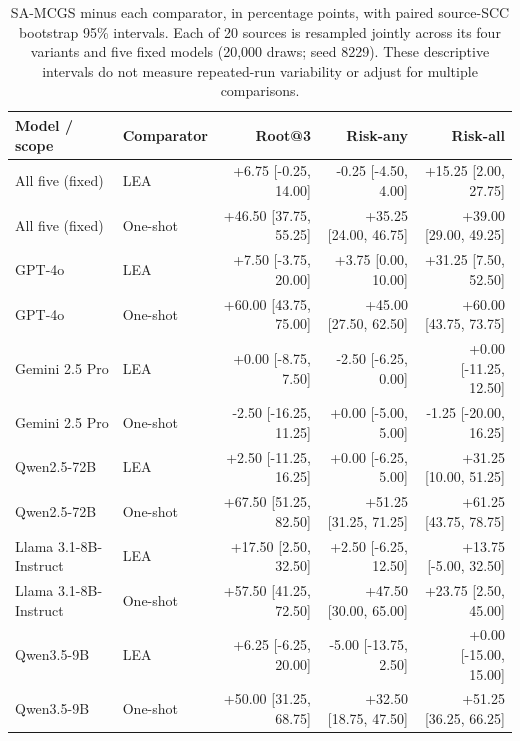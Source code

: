 \begin{revadded}
\begin{table}[t]
\centering\small
\begin{tabular}{llrrr}
\toprule
Model / scope & Comparator & Root@3 & Risk-any & Risk-all \\
\midrule
All five (fixed) & LEA & +6.75 [-0.25, 14.00] & -0.25 [-4.50, 4.00] & +15.25 [2.00, 27.75] \\
All five (fixed) & One-shot & +46.50 [37.75, 55.25] & +35.25 [24.00, 46.75] & +39.00 [29.00, 49.25] \\
GPT-4o & LEA & +7.50 [-3.75, 20.00] & +3.75 [0.00, 10.00] & +31.25 [7.50, 52.50] \\
GPT-4o & One-shot & +60.00 [43.75, 75.00] & +45.00 [27.50, 62.50] & +60.00 [43.75, 73.75] \\
Gemini 2.5 Pro & LEA & +0.00 [-8.75, 7.50] & -2.50 [-6.25, 0.00] & +0.00 [-11.25, 12.50] \\
Gemini 2.5 Pro & One-shot & -2.50 [-16.25, 11.25] & +0.00 [-5.00, 5.00] & -1.25 [-20.00, 16.25] \\
Qwen2.5-72B & LEA & +2.50 [-11.25, 16.25] & +0.00 [-6.25, 5.00] & +31.25 [10.00, 51.25] \\
Qwen2.5-72B & One-shot & +67.50 [51.25, 82.50] & +51.25 [31.25, 71.25] & +61.25 [43.75, 78.75] \\
Llama 3.1-8B-Instruct & LEA & +17.50 [2.50, 32.50] & +2.50 [-6.25, 12.50] & +13.75 [-5.00, 32.50] \\
Llama 3.1-8B-Instruct & One-shot & +57.50 [41.25, 72.50] & +47.50 [30.00, 65.00] & +23.75 [2.50, 45.00] \\
Qwen3.5-9B & LEA & +6.25 [-6.25, 20.00] & -5.00 [-13.75, 2.50] & +0.00 [-15.00, 15.00] \\
Qwen3.5-9B & One-shot & +50.00 [31.25, 68.75] & +32.50 [18.75, 47.50] & +51.25 [36.25, 66.25] \\
\bottomrule\end{tabular}
\caption{SA-MCGS minus each comparator, in percentage points, with paired source-SCC bootstrap 95\% intervals. Each of 20 sources is resampled jointly across its four variants and five fixed models (20,000 draws; seed 8229). These descriptive intervals do not measure repeated-run variability or adjust for multiple comparisons.}
\label{tab:unified_paired_intervals}
\end{table}


\end{revadded}

